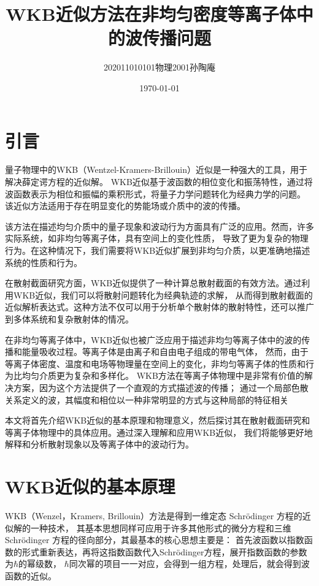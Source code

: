 \documentclass[12pt, a4paper, oneside]{ctexart}
\title{WKB近似方法在非均匀密度等离子体中的波传播问题}
\date{\today}
\author{202011010101物理2001孙陶庵}
\begin{document}
\begin{spacing}{2.0}
\tableofcontents
\maketitle

\section{引言}
量子物理中的WKB（Wentzel-Kramers-Brillouin）近似是一种强大的工具，用于解决薛定谔方程的近似解。
WKB近似基于波函数的相位变化和振荡特性，通过将波函数表示为相位和振幅的乘积形式，将量子力学问题转化为经典力学的问题。
该近似方法适用于存在明显变化的势能场或介质中的波的传播。

该方法在描述均匀介质中的量子现象和波动行为方面具有广泛的应用。然而，许多实际系统，如非均匀等离子体，具有空间上的变化性质，
导致了更为复杂的物理行为。在这种情况下，我们需要将WKB近似扩展到非均匀介质，以更准确地描述系统的性质和行为。

在散射截面研究方面，WKB近似提供了一种计算总散射截面的有效方法。通过利用WKB近似，我们可以将散射问题转化为经典轨迹的求解，
从而得到散射截面的近似解析表达式。这种方法不仅可以用于分析单个散射体的散射特性，还可以推广到多体系统和复杂散射体的情况。

在非均匀等离子体中，WKB近似也被广泛应用于描述非均匀等离子体中的波的传播和能量吸收过程。等离子体是由离子和自由电子组成的带电气体，
然而，由于等离子体密度、温度和电场等物理量在空间上的变化，非均匀等离子体的性质和行为比均匀介质更为复杂和多样化。
WKB方法在等离子体物理中是非常有价值的解决方案，因为这个方法提供了一个直观的方式描述波的传播；
通过一个局部色散关系定义的波，其幅度和相位以一种非常明显的方式与这种局部的特征相关

本文将首先介绍WKB近似的基本原理和物理意义，然后探讨其在散射截面研究和等离子体物理中的具体应用。通过深入理解和应用WKB近似，
我们将能够更好地解释和分析散射现象以及等离子体中的波动行为。


\section{WKB近似的基本原理}
WKB（Wenzel，Kramers, Brillouin）方法是得到一维定态 Schrödinger 方程的近似解的一种技术，
其基本思想同样可应用于许多其他形式的微分方程和三维 Schrödinger 方程的径向部分，其最基本的核心思想主要是：
首先波函数以指数函数的形式重新表达，再将这指数函数代入Schrödinger方程，展开指数函数的参数为$\hbar$的幂级数，
$\hbar$同次幂的项目一一对应，会得到一组方程，处理后，就会得到波函数的近似。

\end{spacing}
\end{document}
